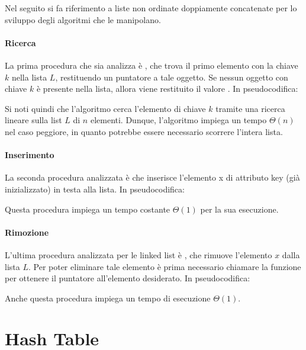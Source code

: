 Nel seguito si fa riferimento a liste non ordinate doppiamente concatenate per lo sviluppo degli algoritmi che le manipolano. 

\paragraph{Ricerca}
La prima procedura che sia analizza è , che trova il primo elemento con la chiave \(k\) nella lista \(L\), restituendo un puntatore a tale oggetto. Se nessun oggetto con chiave \(k\) è presente nella lista, allora viene restituito il valore . In pseudocodifica:



Si noti quindi che l'algoritmo  cerca l'elemento di chiave \(k\) tramite una ricerca lineare sulla list \(L\) di \(n\) elementi. Dunque, l'algoritmo impiega un tempo \(\Theta(n)\) nel caso peggiore, in quanto potrebbe essere necessario scorrere l'intera lista.

\paragraph{Inserimento}
La seconda procedura analizzata è  che inserisce l'elemento x di attributo key (già inizializzato) in testa alla lista. In pseudocodifica:



Questa procedura impiega un tempo costante \(\Theta(1)\) per la sua esecuzione.

\paragraph{Rimozione}
L'ultima procedura analizzata per le linked list è , che rimuove l'elemento \(x\) dalla lista \(L\). Per poter eliminare tale elemento è prima necessario chiamare la funzione  per ottenere il puntatore all'elemento desiderato. In pseudocodifica:



Anche questa procedura impiega un tempo di esecuzione \(\Theta(1)\).

\section{Hash Table}
